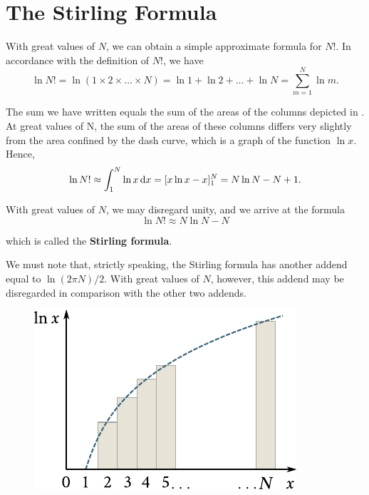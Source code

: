 \section{The Stirling Formula}\label{sec:A_3}

With great values of $N$, we can obtain a simple approximate formula for $N!$. In accordance with the definition of $N!$, we have
\begin{equation*}
    \ln{N!} = \ln(1\times 2\times\ldots\times N) = \ln{1} + \ln{2} + \ldots + \ln{N} = \sum_{m=1}^N \ln{m}.
\end{equation*}

\noindent
The sum we have written equals the sum of the areas of the columns depicted in . At great values of N, the sum of the areas of
these columns differs very slightly from the area confined by the dash curve, which is a graph of the function $\ln{x}$. Hence,
\begin{equation*}
    \ln{N!} \approx \int_1^N \ln{x}\,\mathrm{d} x = [x\ln{x} - x]_1^N = N\ln{N} - N + 1.
\end{equation*}

\noindent
With great values of $N$, we may disregard unity, and we arrive at the formula
\begin{equation}\label{eq:A_7}
    \ln{N!} \approx N \ln{N} - N
\end{equation}

\noindent
which is called the \textbf{Stirling formula}.

We must note that, strictly speaking, the Stirling formula has another addend equal to $\ln(2\pi N)/2$. With great values of $N$, however, this addend may be disregarded in comparison with the other two addends.

\begin{figure}[t]
	\begin{center}
		\includegraphics[scale=1]{figures/appendix/fig_A_1.pdf}
		\caption[]{}
		\label{fig:A_1}
	\end{center}
	\vspace{-0.8cm}
\end{figure}
